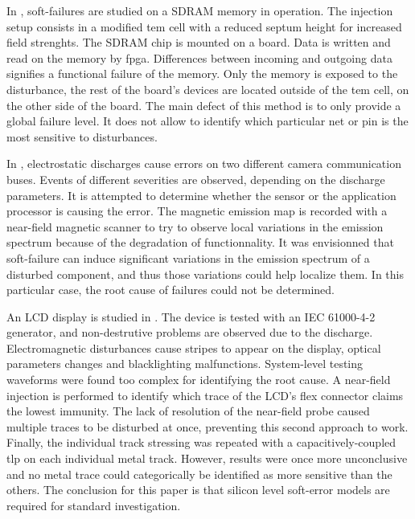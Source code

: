 In \cite{SDRAMCase}, soft-failures are studied on a SDRAM memory in operation.
The injection setup consists in a modified \gls{tem} cell with a reduced septum height for increased field strenghts.
The SDRAM chip is mounted on a board.
Data is written and read on the memory by \gls{fpga}.
Differences between incoming and outgoing data signifies a functional failure of the memory.
Only the memory is exposed to the disturbance, the rest of the board's devices are located outside of the \gls{tem} cell, on the other side of the board.
The main defect of this method is to only provide a global failure level.
It does not allow to identify which particular net or pin is the most sensitive to disturbances.

In \cite{softFailSubsystem}, electrostatic discharges cause errors on two different camera communication buses.
Events of different severities are observed, depending on the discharge parameters.
It is attempted to determine whether the sensor or the application processor is causing the error.
The magnetic emission map is recorded with a near-field magnetic scanner to try to observe local variations in the emission spectrum because of the degradation of functionnality.
It was envisionned that soft-failure can induce significant variations in the emission spectrum of a disturbed component, and thus those variations could help localize them.
In this particular case, the root cause of failures could not be determined.

An LCD display is studied in \cite{softFailLCD}.
The device is tested with an IEC 61000-4-2 \cite{iec61000-4-2} generator, and non-destrutive problems are observed due to the discharge.
Electromagnetic disturbances cause stripes to appear on the display, optical parameters changes and blacklighting malfunctions.
System-level testing waveforms were found too complex for identifying the root cause.
A near-field injection is performed to identify which trace of the LCD's flex connector claims the lowest immunity.
The lack of resolution of the near-field probe caused multiple traces to be disturbed at once, preventing this second approach to work.
Finally, the individual track stressing was repeated with a capacitively-coupled \gls{tlp} on each individual metal track.
However, results were once more unconclusive and no metal trace could categorically be identified as more sensitive than the others.
The conclusion for this paper is that silicon level soft-error models are required for standard investigation.


